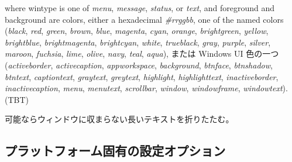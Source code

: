 where wintype is one of {\it menu}, {\it message}, {\it status}, or {\it text}, and
foreground and background are colors, either a hexadecimal {\it \#rrggbb},
one of the named colors ({\it black}, {\it red}, {\it green}, {\it brown},
{\it blue}, {\it magenta}, {\it cyan}, {\it orange},
{\it brightgreen}, {\it yellow}, {\it brightblue}, {\it brightmagenta},
{\it brightcyan}, {\it white}, {\it trueblack}, {\it gray}, {\it purple},
{\it silver}, {\it maroon}, {\it fuchsia}, {\it lime}, {\it olive},
{\it navy}, {\it teal}, {\it aqua}),
または Windows UI 色の一つ ({\it activeborder},
{\it activecaption}, {\it appworkspace}, {\it background}, {\it btnface}, {\it btnshadow},
{\it btntext}, {\it captiontext}, {\it graytext}, {\it greytext}, {\it highlight},
{\it highlighttext}, {\it inactiveborder}, {\it inactivecaption}, {\it menu},
{\it menutext}, {\it scrollbar}, {\it window}, {\it windowframe}, {\it windowtext}).
(TBT)

\item[\ib{wraptext}]
可能ならウィンドウに収まらない長いテキストを折りたたむ。
\elist

\subsection*{プラットフォーム固有の設定オプション}

